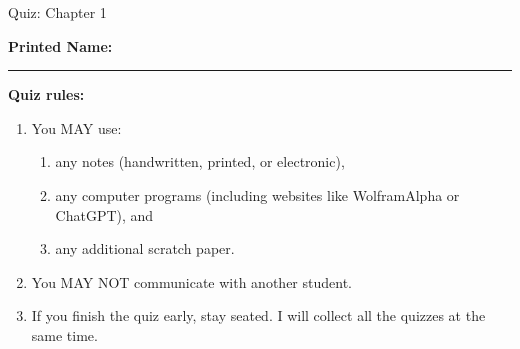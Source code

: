 \documentclass[10pt]{exam}
\theoremstyle{definition}
\begin{document}
\begin{center}
    {
\Large
    Quiz: Chapter 1

    \vspace{0.1in}
}
\end{center}


\vspace{0.2in}
\noindent
\textbf{Printed Name:}

\noindent
\rule{\textwidth}{0.1pt}
\vspace{0.15in}

\noindent
\textbf{Quiz rules:}
\begin{enumerate}
    \item You MAY use:
        \begin{enumerate}
            \item any notes (handwritten, printed, or electronic),
            \item any computer programs (including websites like WolframAlpha or ChatGPT), and
            \item any additional scratch paper.
        \end{enumerate}
    \item You MAY NOT communicate with another student.
    \item If you finish the quiz early, stay seated.
        I will collect all the quizzes at the same time.
\end{enumerate}
\end{document}
